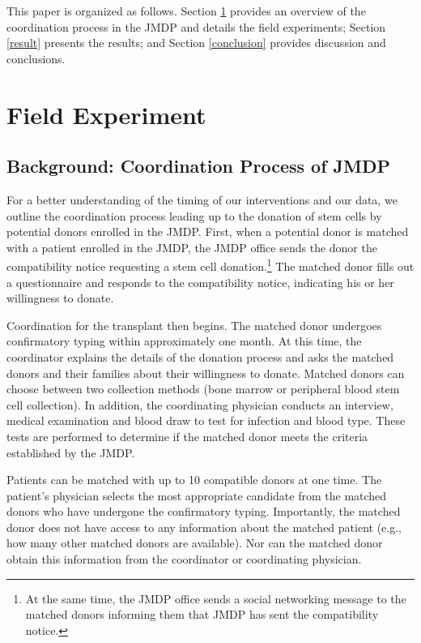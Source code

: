 \documentclass[
]{article}
\begin{document}
This paper is organized as follows. Section \ref{experiment} provides an overview of the coordination process in the JMDP and details the field experiments; Section \ref{result} presents the results; and Section \ref{conclusion} provides discussion and conclusions.

\hypertarget{experiment}{%
\section{Field Experiment}\label{experiment}}

\hypertarget{background}{%
\subsection{Background: Coordination Process of JMDP}\label{background}}

For a better understanding of the timing of our interventions and our data, we outline the coordination process leading up to the donation of stem cells by potential donors enrolled in the JMDP. First, when a potential donor is matched with a patient enrolled in the JMDP, the JMDP office sends the donor the compatibility notice requesting a stem cell donation.\footnote{At the same time, the JMDP office sends a social networking message to the matched donors informing them that JMDP has sent the compatibility notice.} The matched donor fills out a questionnaire and responds to the compatibility notice, indicating his or her willingness to donate.

Coordination for the transplant then begins. The matched donor undergoes confirmatory typing within approximately one month. At this time, the coordinator explains the details of the donation process and asks the matched donors and their families about their willingness to donate. Matched donors can choose between two collection methods (bone marrow or peripheral blood stem cell collection). In addition, the coordinating physician conducts an interview, medical examination and blood draw to test for infection and blood type. These tests are performed to determine if the matched donor meets the criteria established by the JMDP.

Patients can be matched with up to 10 compatible donors at one time. The patient's physician selects the most appropriate candidate from the matched donors who have undergone the confirmatory typing. Importantly, the matched donor does not have access to any information about the matched patient (e.g., how many other matched donors are available). Nor can the matched donor obtain this information from the coordinator or coordinating physician.
\end{document}
